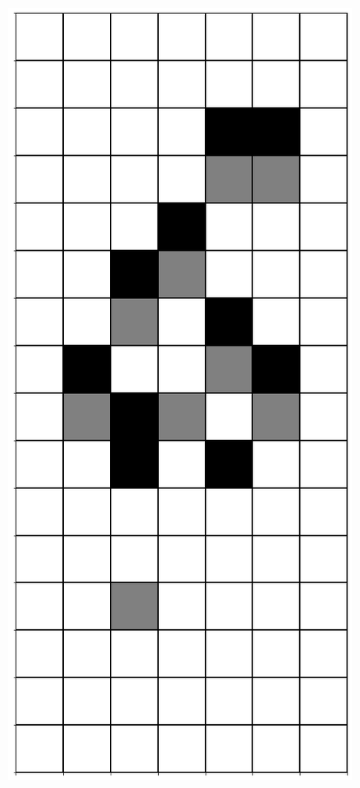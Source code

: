 \documentclass[12pt]{article}
\numberwithin{figure}{section} %
\begin{document}
\begin{figure}[H]
\begin{subfigure}{0.18\textwidth}
     		\subcaption{}
   	\end{subfigure}
        	\begin{subfigure}{0.18\textwidth}
     		\centering
     		\includegraphics[width=\linewidth]{Section4/19.3}

\end{subfigure}
\end{figure}
\end{document}
